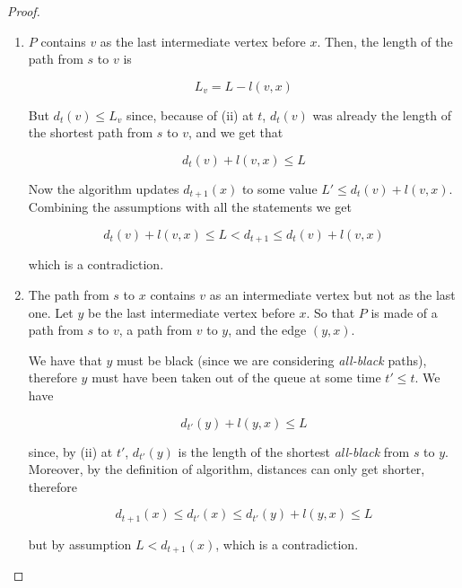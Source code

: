 \documentclass[12pt]{extarticle}
\begin{document}
\begin{proof}
\begin{description}
\begin{enumerate}[label=\alph*.]
                  \item
                        $P$ contains $v$ as the last intermediate vertex before $x$.
                        Then, the length of the path from $s$ to $v$ is

                        $$
                            L_v = L - l(v, x)
                        $$

                        But $d_t(v) \leq L_v$ since, because of (ii) at $t$, $d_t(v)$ was already the length of the shortest path from $s$ to $v$, and we get that

                        $$
                            d_t(v) + l(v,x) \leq L
                        $$

                        Now the algorithm updates $d_{t+1}(x)$ to some value $L' \leq d_t(v) + l(v, x)$.
                        Combining the assumptions with all the statements we get

                        $$
                            d_t(v) + l(v, x) \leq L < d_{t+1} \leq d_t(v) + l(v, x)
                        $$

                        which is a contradiction.

                  \item
                        The path from $s$ to $x$ contains $v$ as an intermediate vertex but not as the last one.
                        Let $y$ be the last intermediate vertex before $x$.
                        So that $P$ is made of a path from $s$ to $v$, a path from $v$ to $y$, and the edge $(y, x)$.

                        We have that $y$ must be black (since we are considering \textit{all-black} paths), therefore $y$ must have been taken out of the queue at some time $t' \leq t$. We have

                        $$
                            d_{t'}(y) + l(y, x) \leq L
                        $$

                        since, by (ii) at $t'$, $d_{t'}(y)$ is the length of the shortest \textit{all-black} from $s$ to $y$.
                        Moreover, by the definition of algorithm, distances can only get shorter, therefore

                        $$
                            d_{t+1}(x) \leq d_{t'}(x) \leq d_{t'}(y) + l(y, x) \leq L
                        $$

                        but by assumption $L < d_{t+1}(x)$, which is a contradiction.
              \end{enumerate}
    \end{description}
\end{proof}
\end{document}
